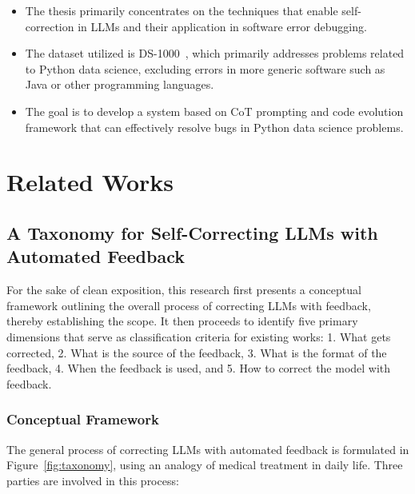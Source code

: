 \documentclass[a4paper,oneside]{book}
\begin{document}
\begin{itemize}
    \item The thesis primarily concentrates on the techniques that enable self-correction in LLMs and their application in software error debugging.

    \item The dataset utilized is DS-1000~\cite{pmlr-v202-lai23b}, which primarily addresses problems related to Python data science, excluding errors in more generic software such as Java or other programming languages.

    \item The goal is to develop a system based on CoT prompting and code evolution framework that can effectively resolve bugs in Python data science problems.
\end{itemize}

\chapter{Related Works}

\section{A Taxonomy for Self-Correcting LLMs with Automated Feedback}
For the sake of clean exposition, this research first presents a conceptual framework outlining the overall process of correcting LLMs with feedback, thereby establishing the scope. It then proceeds to identify five primary dimensions that serve as classification criteria for existing works: 1. What gets corrected, 2. What is the source of the feedback, 3. What is the format of the feedback, 4. When the feedback is used, and 5. How to correct the model with feedback.

\subsection{Conceptual Framework}
The general process of correcting LLMs with automated feedback is formulated in Figure~\ref{fig:taxonomy}, using an analogy of medical treatment in daily life. Three parties are involved in this process:
\end{document}
